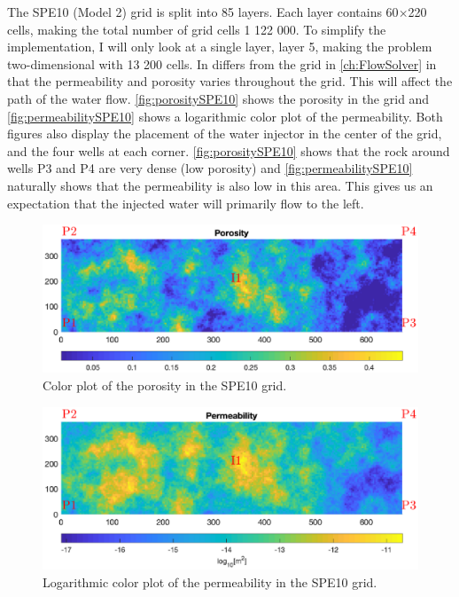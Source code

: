 The SPE10 (Model 2) grid is split into 85 layers. Each layer contains 60$\times$220 cells, making the total number of grid cells 1 122 000. To simplify the implementation, I will only look at a single layer, layer 5, making the problem two-dimensional with 13 200 cells. In differs from the grid in \autoref{ch:FlowSolver} in that the permeability and porosity varies throughout the grid. This will affect the path of the water flow. \autoref{fig:porositySPE10} shows the porosity in the grid and \autoref{fig:permeabilitySPE10} shows a logarithmic color plot of the permeability. Both figures also display the placement of the water injector in the center of the grid, and the four wells at each corner. \autoref{fig:porositySPE10} shows that the rock around wells P3 and P4 are very dense (low porosity) and \autoref{fig:permeabilitySPE10} naturally shows that the permeability is also low in this area. This gives us an expectation that the injected water will primarily flow to the left.
\begin{figure}[H]
    \centering
    \includegraphics[width = \textwidth,clip=true,trim=20 130 10 90]{figures/porositySPE10.eps}
    \caption{Color plot of the porosity in the SPE10 grid.}
    \label{fig:porositySPE10}
\end{figure}
\begin{figure}[H]
    \centering
    \includegraphics[width = \textwidth,clip=true,trim=20 120 10 90]{figures/permeabilitySPE10.eps}
    \caption{Logarithmic color plot of the permeability in the SPE10 grid.}
    \label{fig:permeabilitySPE10}
\end{figure}

